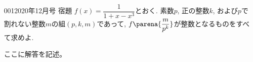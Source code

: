 \begin{prob}{001}{}{2020年12月号 宿題}
 $f(x)=\dfrac{1}{1+x-x^3}$とおく. 素数$p$, 正の整数$k$, および$p$で割れない整数$m$の組$(p,k,m)$であって, $f\parena{\dfrac{m}{p^k}}$が整数となるものをすべて求めよ.
\end{prob}

ここに解答を記述。
